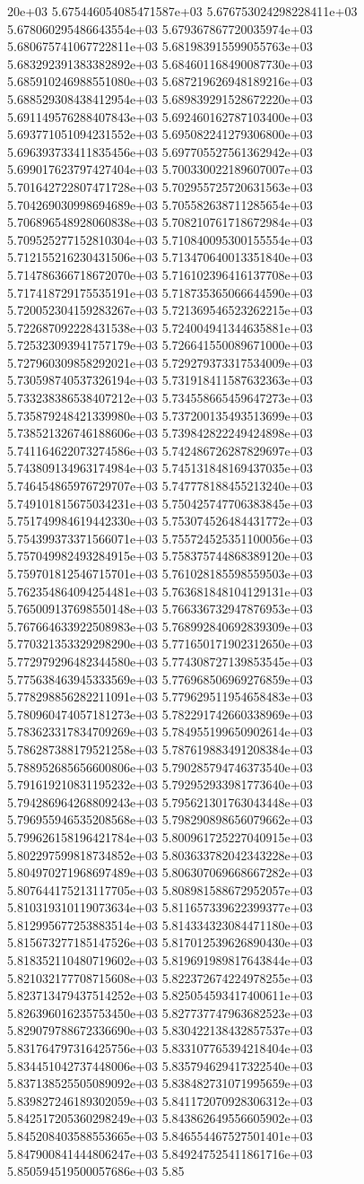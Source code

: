 20e+03	5.675446054085471587e+03	5.676753024298228411e+03	5.678060295486643554e+03	5.679367867720035974e+03	5.680675741067722811e+03	5.681983915599055763e+03	5.683292391383382892e+03	5.684601168490087730e+03	5.685910246988551080e+03	5.687219626948189216e+03	5.688529308438412954e+03	5.689839291528672220e+03	5.691149576288407843e+03	5.692460162787103400e+03	5.693771051094231552e+03	5.695082241279306800e+03	5.696393733411835456e+03	5.697705527561362942e+03	5.699017623797427404e+03	5.700330022189607007e+03	5.701642722807471728e+03	5.702955725720631563e+03	5.704269030998694689e+03	5.705582638711285654e+03	5.706896548928060838e+03	5.708210761718672984e+03	5.709525277152810304e+03	5.710840095300155554e+03	5.712155216230431506e+03	5.713470640013351840e+03	5.714786366718672070e+03	5.716102396416137708e+03	5.717418729175535191e+03	5.718735365066644590e+03	5.720052304159283267e+03	5.721369546523262215e+03	5.722687092228431538e+03	5.724004941344635881e+03	5.725323093941757179e+03	5.726641550089671000e+03	5.727960309858292021e+03	5.729279373317534009e+03	5.730598740537326194e+03	5.731918411587632363e+03	5.733238386538407212e+03	5.734558665459647273e+03	5.735879248421339980e+03	5.737200135493513699e+03	5.738521326746188606e+03	5.739842822249424898e+03	5.741164622073274586e+03	5.742486726287829697e+03	5.743809134963174984e+03	5.745131848169437035e+03	5.746454865976729707e+03	5.747778188455213240e+03	5.749101815675034231e+03	5.750425747706383845e+03	5.751749984619442330e+03	5.753074526484431772e+03	5.754399373371566071e+03	5.755724525351100056e+03	5.757049982493284915e+03	5.758375744868389120e+03	5.759701812546715701e+03	5.761028185598559503e+03	5.762354864094254481e+03	5.763681848104129131e+03	5.765009137698550148e+03	5.766336732947876953e+03	5.767664633922508983e+03	5.768992840692839309e+03	5.770321353329298290e+03	5.771650171902312650e+03	5.772979296482344580e+03	5.774308727139853545e+03	5.775638463945333569e+03	5.776968506969276859e+03	5.778298856282211091e+03	5.779629511954658483e+03	5.780960474057181273e+03	5.782291742660338969e+03	5.783623317834709269e+03	5.784955199650902614e+03	5.786287388179521258e+03	5.787619883491208384e+03	5.788952685656600806e+03	5.790285794746373540e+03	5.791619210831195232e+03	5.792952933981773640e+03	5.794286964268809243e+03	5.795621301763043448e+03	5.796955946535208568e+03	5.798290898656079662e+03	5.799626158196421784e+03	5.800961725227040915e+03	5.802297599818734852e+03	5.803633782042343228e+03	5.804970271968697489e+03	5.806307069668667282e+03	5.807644175213117705e+03	5.808981588672952057e+03	5.810319310119073634e+03	5.811657339622399377e+03	5.812995677253883514e+03	5.814334323084471180e+03	5.815673277185147526e+03	5.817012539626890430e+03	5.818352110480719602e+03	5.819691989817643844e+03	5.821032177708715608e+03	5.822372674224978255e+03	5.823713479437514252e+03	5.825054593417400611e+03	5.826396016235753450e+03	5.827737747963682523e+03	5.829079788672336690e+03	5.830422138432857537e+03	5.831764797316425756e+03	5.833107765394218404e+03	5.834451042737448006e+03	5.835794629417322540e+03	5.837138525505089092e+03	5.838482731071995659e+03	5.839827246189302059e+03	5.841172070928306312e+03	5.842517205360298249e+03	5.843862649556605902e+03	5.845208403588553665e+03	5.846554467527501401e+03	5.847900841444806247e+03	5.849247525411861716e+03	5.850594519500057686e+03	5.85